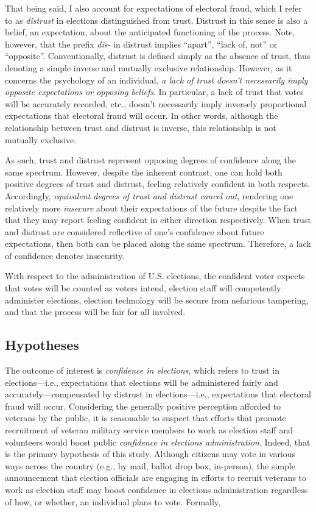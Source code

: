 \documentclass[
  12pt,
  letterpaper,
]{article}
\begin{document}
That being said, I also account for expectations of electoral fraud,
which I refer to as \emph{distrust} in elections distinguished from
trust. Distrust in this sense is also a belief, an expectation, about
the anticipated functioning of the process. Note, however, that the
prefix \emph{dis-} in distrust implies ``apart'', ``lack of, not'' or
``opposite''. Conventionally, distrust is defined simply as the absence
of trust, thus denoting a simple inverse and mutually exclusive
relationship. However, as it concerns the psychology of an individual,
\emph{a lack of trust doesn't necessarily imply opposite expectations or
opposing beliefs}. In particular, a lack of trust that votes will be
accurately recorded, etc., doesn't necessarily imply inversely
proportional expectations that electoral fraud will occur. In other
words, although the relationship between trust and distrust is inverse,
this relationship is not mutually exclusive.

As such, trust and distrust represent opposing degrees of confidence
along the same spectrum. However, despite the inherent contrast, one can
hold both positive degrees of trust and distrust, feeling relatively
confident in both respects. Accordingly, \emph{equivalent degrees of
trust and distrust cancel out}, rendering one relatively more
\emph{insecure} about their expectations of the future despite the fact
that they may report feeling confident in either direction respectively.
When trust and distrust are considered reflective of one's confidence
about future expectations, then both can be placed along the same
spectrum. Therefore, a lack of confidence denotes insecurity.

With respect to the administration of U.S. elections, the confident
voter expects that votes will be counted as voters intend, election
staff will competently administer elections, election technology will be
secure from nefarious tampering, and that the process will be fair for
all involved.

\subsection{Hypotheses}\label{hypotheses}

The outcome of interest is \emph{confidence in elections}, which refers
to trust in elections---i.e., expectations that elections will be
administered fairly and accurately---compensated by distrust in
elections---i.e., expectations that electoral fraud will occur.
Considering the generally positive perception afforded to veterans by
the public, it is reasonable to suspect that efforts that promote
recruitment of veteran military service members to work as election
staff and volunteers would boost public \emph{confidence in elections
administration}. Indeed, that is the primary hypothesis of this study.
Although citizens may vote in various ways across the country (e.g., by
mail, ballot drop box, in-person), the simple announcement that election
officials are engaging in efforts to recruit veterans to work as
election staff may boost confidence in elections administration
regardless of how, or whether, an individual plans to vote. Formally,
\end{document}
